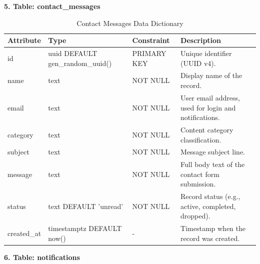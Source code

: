 \documentclass[12pt, oneside]{article} %
\newcommand{\tabbreak}{\hyphenpenalty=200\exhyphenpenalty=200\tolerance=4000\hbadness=10000\hspace{0pt}}
\begin{document}
\textbf{5. Table: contact\_messages}

\begin{table}[H]
\caption{Contact Messages Data Dictionary}
\label{tab:dd_contact_messages}
\vspace{-4mm}
\begin{center}
\renewcommand{\arraystretch}{1.15}
\scriptsize
\begin{tabular}{|>{\raggedright\arraybackslash\tabbreak}p{2.67cm}|>{\raggedright\arraybackslash\tabbreak}p{2.93cm}|>{\raggedright\arraybackslash\tabbreak}p{2.67cm}|>{\raggedright\arraybackslash\tabbreak}p{4.51cm}|}
\hline
\textbf{Attribute} & \textbf{Type} & \textbf{Constraint} & \textbf{Description} \\ \hline
id & uuid DEFAULT gen\_random\_uuid() & PRIMARY KEY & Unique identifier (UUID v4). \\ \hline
name & text & NOT NULL & Display name of the record. \\ \hline
email & text & NOT NULL & User email address, used for login and notifications. \\ \hline
category & text & NOT NULL & Content category classification. \\ \hline
subject & text & NOT NULL & Message subject line. \\ \hline
message & text & NOT NULL & Full body text of the contact form submission. \\ \hline
status & text DEFAULT 'unread' & NOT NULL & Record status (e.g., active, completed, dropped). \\ \hline
created\_at & timestamptz DEFAULT now() & - & Timestamp when the record was created. \\ \hline
\end{tabular}
\end{center}
\end{table}

\textbf{6. Table: notifications}
\end{document}
